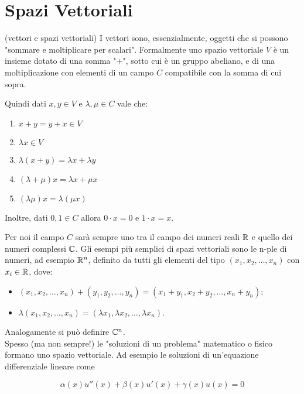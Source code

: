 \chapter{Spazi Vettoriali}

\begin{definition}{(vettori e spazi vettoriali)}
I vettori sono, essenzialmente, oggetti che si possono "sommare e moltiplicare per scalari". Formalmente uno spazio vettoriale $V$ è un insieme dotato di una somma "$+$", sotto cui è un gruppo abeliano, e di una moltiplicazione con elementi di un campo $C$ compatibile con la somma di cui sopra. 
\end{definition}

Quindi dati $x,y \in V$ e $\lambda, \mu \in C$ vale che:

\begin{enumerate}
\item $x+y = y+x \in V$
\item $\lambda x \in V$
\item $\lambda(x+y) = \lambda x + \lambda y$
\item $(\lambda + \mu)x = \lambda x + \mu x$
\item $(\lambda \mu)x = \lambda (\mu x)$
\end{enumerate} 

Inoltre, dati $0,1 \in C$ allora $0 \cdot x = 0$ e $1 \cdot x = x$.

Per noi il campo $C$ sarà sempre uno tra il campo dei numeri reali $\mathbb R$ e quello dei numeri complessi $\mathbb C$. Gli esempi più semplici di spazi vettoriali sono le n-ple di numeri, ad esempio $\mathbb R^n$, definito da tutti gli elementi del tipo $(x_1, x_2, \ldots , x_n)$ con $x_i \in \mathbb R$, dove:

\begin{itemize}
\item $(x_1, x_2, \ldots , x_n) + (y_1, y_2, \ldots , y_n) = (x_1 + y_1, x_2 + y_2,\ldots, x_n + y_n)$;
\item $\lambda (x_1, x_2, \ldots , x_n) = (\lambda x_1,\lambda x_2, \ldots , \lambda x_n)$.
\end{itemize} 

Analogamente si può definire $\mathbb C^n$.\\

Spesso (ma non sempre!) le "soluzioni di un problema" matematico o fisico formano uno spazio vettoriale. Ad esempio le soluzioni di un'equazione differenziale lineare come

\begin{equation}
\alpha(x) u''(x) + \beta(x) u'(x) + \gamma(x) u(x) = 0
\end{equation}
 
